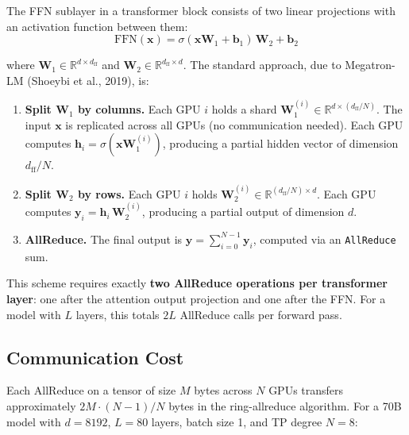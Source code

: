 The FFN sublayer in a transformer block consists of two linear projections with an activation function between them:
\begin{equation}
\text{FFN}(\mathbf{x}) = \sigma(\mathbf{x}\mathbf{W}_1 + \mathbf{b}_1) \, \mathbf{W}_2 + \mathbf{b}_2
\end{equation}

\noindent where $\mathbf{W}_1 \in \mathbb{R}^{d \times d_{\text{ff}}}$ and $\mathbf{W}_2 \in \mathbb{R}^{d_{\text{ff}} \times d}$. The standard approach, due to Megatron-LM (Shoeybi et al., 2019), is:

\begin{enumerate}
\item \textbf{Split $\mathbf{W}_1$ by columns.} Each GPU $i$ holds a shard $\mathbf{W}_1^{(i)} \in \mathbb{R}^{d \times (d_{\text{ff}}/N)}$. The input $\mathbf{x}$ is replicated across all GPUs (no communication needed). Each GPU computes $\mathbf{h}_i = \sigma(\mathbf{x}\mathbf{W}_1^{(i)})$, producing a partial hidden vector of dimension $d_{\text{ff}}/N$.
\item \textbf{Split $\mathbf{W}_2$ by rows.} Each GPU $i$ holds $\mathbf{W}_2^{(i)} \in \mathbb{R}^{(d_{\text{ff}}/N) \times d}$. Each GPU computes $\mathbf{y}_i = \mathbf{h}_i \, \mathbf{W}_2^{(i)}$, producing a partial output of dimension $d$.
\item \textbf{AllReduce.} The final output is $\mathbf{y} = \sum_{i=0}^{N-1} \mathbf{y}_i$, computed via an \texttt{AllReduce} sum.
\end{enumerate}

%
This scheme requires exactly \textbf{two AllReduce operations per transformer layer}: one after the attention output projection and one after the FFN. For a model with $L$ layers, this totals $2L$ AllReduce calls per forward pass.

\subsection{Communication Cost}

Each AllReduce on a tensor of size $M$ bytes across $N$ GPUs transfers approximately $2M \cdot (N-1)/N$ bytes in the ring-allreduce algorithm. For a 70B model with $d = 8192$, $L = 80$ layers, batch size 1, and TP degree $N = 8$:

